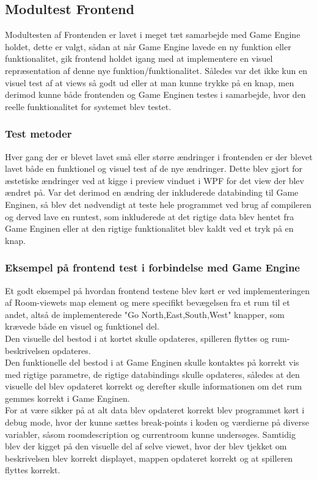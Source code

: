\subsection{Modultest Frontend}
Modultesten af Frontenden er lavet i meget tæt samarbejde med Game Engine holdet, dette er valgt, sådan at når Game Engine lavede en ny funktion eller funktionalitet, gik frontend holdet igang med at implementere en visuel repræsentation af denne nye funktion/funktionalitet. Således var det ikke kun en visuel test af at views så godt ud eller at man kunne trykke på en knap, men derimod kunne både frontenden og Game Enginen testes i samarbejde, hvor den reelle funktionalitet for systemet blev testet.

\subsubsection{Test metoder}
Hver gang der er blevet lavet små eller større ændringer i frontenden er der blevet lavet både en funktionel og visuel test af de nye ændringer. Dette blev gjort for æstetiske ændringer ved at kigge i preview vinduet i WPF for det view der blev ændret på. Var det derimod en ændring der inkluderede databinding til Game Enginen, så blev det nødvendigt at teste hele programmet ved brug af compileren og derved lave en runtest, som inkluderede at det rigtige data blev hentet fra Game Enginen eller at den rigtige funktionalitet blev kaldt ved et tryk på en knap.

\subsubsection{Eksempel på frontend test i forbindelse med Game Engine}
Et godt eksempel på hvordan frontend testene blev kørt er ved implementeringen af Room-viewets map element og mere specifikt bevægelsen fra et rum til et andet, altså de implementerede "Go North,East,South,West" knapper, som krævede både en visuel og funktionel del.\\
Den visuelle del bestod i at kortet skulle opdateres, spilleren flyttes og rum-beskrivelsen opdateres.\\
Den funktionelle del bestod i at Game Enginen skulle kontaktes på korrekt vis med rigtige parametre, de rigtige databindings skulle opdateres, således at den visuelle del blev opdateret korrekt og derefter skulle informationen om det rum gemmes korrekt i Game Enginen.\\
For at være sikker på at alt data blev opdateret korrekt blev programmet kørt i debug mode, hvor der kunne sættes break-points i koden og værdierne på diverse variabler, såsom roomdescription og currentroom kunne undersøges. Samtidig blev der kigget på den visuelle del af selve viewet, hvor der blev tjekket om beskrivelsen blev korrekt displayet, mappen opdateret korrekt og at spilleren flyttes korrekt.
